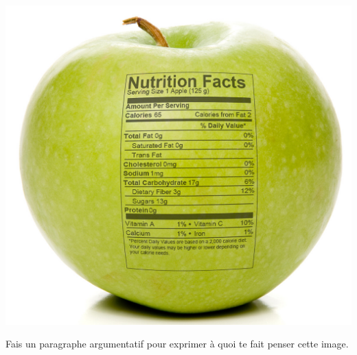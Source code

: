 

\begin{center}
\includegraphics[scale=0.5]{Prop-33.jpg}
\end{center}

Fais un paragraphe argumentatif pour exprimer à quoi te fait penser cette image.




